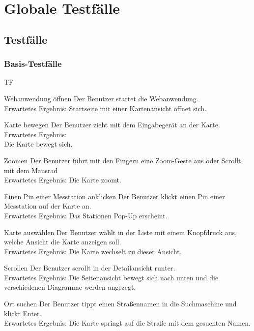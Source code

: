 \section{Globale Testfälle}
\subsection{Testfälle}
\setcounter{counter}{10}
\subsubsection{Basis-Testfälle}
\begin{Kriterien}{TF}

	\item[Webanwendung öffnen] Der Benutzer startet die \gls{Webanwendung}. \\ Erwartetes Ergebnis: Startseite mit einer Kartenansicht öffnet sich.

	\item[Karte bewegen] Der Benutzer zieht mit dem Eingabegerät an der Karte. Erwartetes Ergebnis: \\ Die Karte bewegt sich.
	
	\item[Zoomen] Der Benutzer führt mit den Fingern eine Zoom-Geste aus oder Scrollt mit dem Mausrad \\ Erwartetes Ergebnis: Die Karte zoomt.
	
	\item[Einen Pin einer Messtation anklicken] Der Benutzer klickt einen Pin einer Messtation auf der Karte an. \\ Erwartetes Ergebnis: Das Stationen Pop-Up erscheint.
	
	\item[Karte auswählen] Der Benutzer wählt in der Liste mit einem Knopfdruck aus, welche Ansicht die Karte anzeigen soll. \\ Erwartetes Ergebnis: Die Karte wechselt zu dieser Ansicht.
	
	\item[Scrollen] Der Benutzer scrollt in der Detailansicht runter. \\ Erwartetes Ergebnis: Die Seitenansicht bewegt sich nach unten und die verschiedenen Diagramme werden angezegt.
	
	\item[Ort suchen] Der Benutzer tippt einen Straßennamen in die Suchmaschine und klickt Enter. \\ Erwartetes Ergebnis: Die Karte springt auf die Straße mit dem gesuchten Namen.
	

\end{Kriterien}
